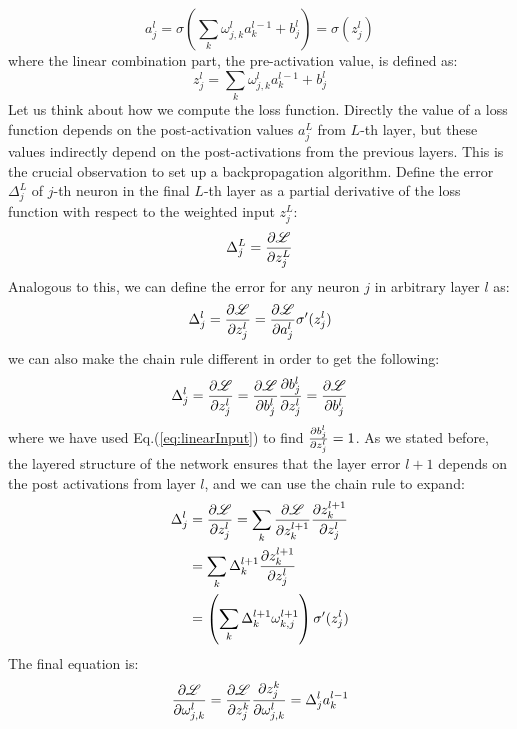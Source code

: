 \begin{equation}
	a_j^l = \sigma \left(\sum_k \omega^l_{j,k}a_k^{l-1} + b_j^l\right) = \sigma(z_j^l)
	\label{eq:postactivation}
\end{equation}
where the linear combination part, the pre-activation value, is defined as:
\begin{equation}
	z_j^l = \sum_k \omega^l_{j,k}a_k^{l-1} + b_j^l
	\label{eq:linearInput}
\end{equation}
Let us think about how we compute the loss function. Directly the value of a loss function depends on the post-activation values $a_j^L$ from $L$-th layer, but these values indirectly depend on the post-activations from the previous layers. This is the crucial observation to set up a backpropagation algorithm. Define the error $\Delta_j^L$ of $j$-th neuron in the final $L$-th layer as a partial derivative of the loss function with respect to the weighted input $z_j^L$:
\begin{equation}
	\Delta_j^L = \pdv{\mathcal{L}}{z_j^L}
\end{equation}
Analogous to this, we can define the error for any neuron $j$ in arbitrary layer $l$ as:
\begin{equation}
	\Delta_j^l = \pdv{\mathcal{L}}{z_j^l} = \pdv{\mathcal{L}}{a_j^l}\sigma'(z_j^l)
	\label{eq:firstBackprop}
\end{equation}
we can also make the chain rule different in order to get the following:
\begin{equation}
	\Delta_j^l = \pdv{\mathcal{L}}{z_j^l} = \pdv{\mathcal{L}}{b_j^l}\pdv{b_j^l}{z_j^l} = \pdv{\mathcal{L}}{b_j^l}
	\label{eq:secondBackprop}
\end{equation}
where we have used Eq.(\ref{eq:linearInput}) to find $\pdv{b_j^l}{z_j^l}=1$. As we stated before, the layered structure of the network ensures that the layer error $l+1$ depends on the post activations from layer $l$, and we can use the chain rule to expand:
\begin{equation}
	\begin{split}
		\Delta_j^l &= \pdv{\mathcal{L}}{z_j^l} = \sum_k \pdv{\mathcal{L}}{z_k^{l+1}} \pdv{z_k^{l+1}}{z_j^l} \\
		&= \sum_k \Delta_k^{l+1} \pdv{z_k^{l+1}}{z_j^l} \\
		&= \left(\sum_k \Delta_k^{l+1}\omega_{k,j}^{l+1}\right)\sigma'(z_j^l)
	\end{split}
	\label{eq:thirdBackprop}
\end{equation}
The final equation is:
\begin{equation}
	\pdv{\mathcal{L}}{\omega_{j,k}^l}=\pdv{\mathcal{L}}{z_j^k}\pdv{z_j^k}{\omega_{j,k}^l} = \Delta_j^l a_k^{l-1}
	\label{eq:fourthBackprop}
\end{equation}
